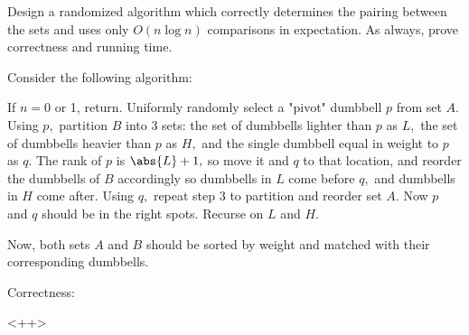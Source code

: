 \documentclass{article}
\begin{document}
Design a randomized algorithm which correctly determines the pairing between the sets and uses only $O(n \log n)$ comparisons in expectation.  As always, prove correctness and running time.
\begin{soln}
	Consider the following algorithm:
	\begin{enumerate}
		\ii If $n=0$ or 1, return.
		\ii Uniformly randomly select a "pivot" dumbbell $p$ from set $A.$
		\ii Using $p,$ partition $B$ into 3 sets: the set of dumbbells lighter than $p$ as $L,$ the set of dumbbells heavier than $p$ as $H,$ and the single dumbbell equal in weight to $p$ as $q.$ The rank of $p$ is $\abs{L}+1,$ so move it and $q$ to that location, and reorder the dumbbells of $B$ accordingly so dumbbells in $L$ come before $q,$ and dumbbells in $H$ come after.
		\ii Using $q,$ repeat step 3 to partition and reorder set $A.$ Now $p$ and $q$ should be in the right spots.
		\ii Recurse on $L$ and $H.$
	\end{enumerate}
	Now, both sets $A$ and $B$ should be sorted by weight and matched with their corresponding dumbbells. 

	Correctness:
	\begin{subproof}
		
	\end{subproof}<++>


\end{soln}
\end{document}
